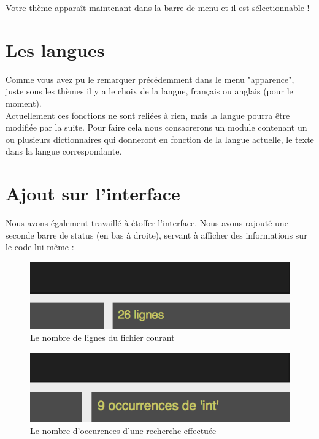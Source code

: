 \documentclass[a4paper,12pt]{article}
\begin{document}
			Votre thème apparaît maintenant dans la barre de menu et il est sélectionnable !
			
	\section{Les langues}
	
		Comme vous avez pu le remarquer précédemment dans le menu "apparence", juste sous les thèmes il y a le choix de la langue, français ou anglais (pour le moment).\\
		
		Actuellement ces fonctions ne sont reliées à rien, mais la langue pourra être modifiée par la suite.
		Pour faire cela nous consacrerons un module contenant un ou plusieurs dictionnaires qui donneront en fonction de la langue actuelle, le texte dans la langue correspondante. 

	\section{Ajout sur l'interface}
	
		Nous avons également travaillé à étoffer l'interface. Nous avons rajouté une seconde barre de status (en bas à droite), servant à afficher des informations sur le code lui-même :
		
		\begin{figure}[h!]
			\begin{center}
				\includegraphics[scale=1]{imgs/nb_lignes}
				\caption{Le nombre de lignes du fichier courant}
			\end{center}
		\end{figure}
		\begin{figure}[h!]
			\begin{center}
				\includegraphics[scale=1]{imgs/nb_occu}
				\caption{Le nombre d'occurences d'une recherche effectuée}
			\end{center}
		\end{figure}
		
\end{document}
